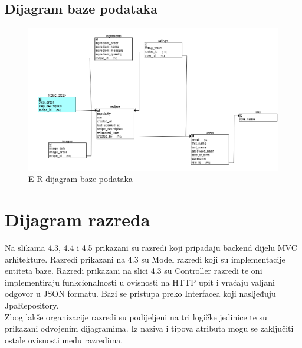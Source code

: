 \newpage

\subsection{Dijagram baze podataka}


\begin{figure}[H]
	\includegraphics[scale=0.65]{slike/Slika12.png} %
	\centering
	\caption{E-R dijagram baze podataka}
	\label{fig:promjene}
\end{figure}


\eject


\section{Dijagram razreda}
Na slikama 4.3, 4.4 i 4.5 prikazani su razredi koji pripadaju backend dijelu MVC arhitekture. Razredi prikazani na 4.3 su Model razredi koji su implementacije entiteta baze. Razredi prikazani na slici 4.3 su Controller razredi te oni implementiraju funkcionalnosti u ovisnosti na HTTP upit i vraćaju valjani odgovor u JSON formatu. Bazi se pristupa preko Interfacea koji nasljeđuju JpaRepository. \\

Zbog lakše organizacije razredi su podijeljeni na tri logičke jedinice te su prikazani odvojenim dijagramima. Iz naziva i tipova atributa mogu se zaključiti ostale ovisnosti među razredima.

